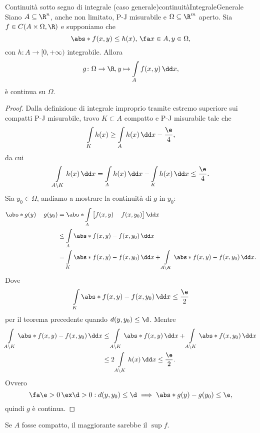 \begin{teor}{Continuità sotto segno di integrale (caso generale)}{continuitàIntegraleGenerale}
	Siano \(A \subseteq \R^n\), anche non limitato, P-J misurabile e \(\Omega \subseteq \R^m\) aperto.
	Sia \(f\in C(A\times \Omega, \R)\) e supponiamo che
	\[
		\abs*{f(x,y)} \le h(x),\,\fa x\in A,y \in \Omega,
	\]
	con \(h\colon A \to [0,+\infty)\) integrabile.
	Allora
	\[
		g\colon \Omega \to \R, y \mapsto \int\limits_A f(x,y)\,\dd x,
	\]
	è continua su \(\Omega\).
\end{teor}

\begin{proof}
	Dalla definizione di integrale improprio tramite estremo superiore sui compatti P-J misurabile, trovo \(K\subset A\) compatto e P-J misurabile tale che
	\[
		\int\limits_K h(x) \ge \int\limits_A h(x)\,\dd x - \frac{\e}{4},
	\]
	da cui
	\[
		\int\limits_{A\setminus K}h(x)\,\dd x = \int\limits_A h(x)\,\dd x - \int\limits_K h(x)\,\dd x \le \frac{\e}{4}.
	\]
	Sia \(y_0\in \Omega\), andiamo a mostrare la continuità di \(g\) in \(y_0\):
	\[
		\begin{split}
			\abs*{g(y)-g(y_0)} & = \abs*{\int\limits_A \big[f(x,y)-f(x,y_0)\big]\,\dd x}\\
			& \le \int\limits_A \abs*{f(x,y)-f(x,y_0)}\,\dd x\\
			& = \int\limits_K \abs*{f(x,y)-f(x,y_0)}\,\dd x + \int\limits_{A\setminus K}\abs*{f(x,y)-f(x,y_0)}\,\dd x.
		\end{split}
	\]
	Dove
	\[
		\int\limits_K \abs*{f(x,y)-f(x,y_0)}\,\dd x \le \frac{\e}{2}
	\]
	per il teorema precedente quando \(d(y,y_0)\le \d\).
	Mentre
	\[
		\begin{split}
			\int\limits_{A\setminus K}\abs*{f(x,y)-f(x,y_0)}\,\dd x & \le \int\limits_{A\setminus K}\abs*{f(x,y)}\,\dd x + \int\limits_{A\setminus K}\abs*{f(x,y_0)}\,\dd x\\
			& \le 2\int\limits_{A\setminus K}h(x)\,\dd x \le \frac{\e}{2}.
		\end{split}
	\]
	Ovvero
	\[
		\fa \e >0 \,\ex \d >0 : d(y,y_0)\le \d \implies \abs*{g(y)-g(y_0)} \le \e,
	\]
	quindi \(g\) è continua.
\end{proof}

\begin{oss}
	Se \(A\) fosse compatto, il maggiorante sarebbe il \(\sup f\).
\end{oss}

